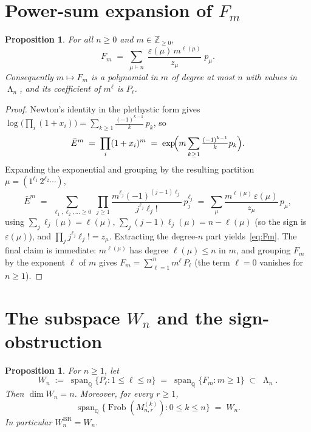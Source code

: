 \documentclass[11pt]{article}
\newtheorem{proposition}[theorem]{Proposition}
\theoremstyle{definition}
\DeclareMathOperator{\Frob}{Frob}
\DeclareMathOperator{\Lam}{\Lambda}
\DeclareMathOperator{\spann}{span}
\newcommand{\bE}{\bar{E}}
\newcommand{\eps}{\varepsilon}
\newcommand{\ZZ}{\mathbb{Z}}
\newcommand{\QQ}{\mathbb{Q}}
\begin{document}
\section{Power-sum expansion of $F_m$}

\begin{proposition}\label{prop:Fm}
For all $n\ge 0$ and $m\in\ZZ_{\ge 0}$,
\begin{equation}\label{eq:Fm}
   F_m \;=\; \sum_{\mu\vdash n}\;\frac{\eps(\mu)\,m^{\ell(\mu)}}{z_\mu}\;p_\mu.
\end{equation}
Consequently $m\mapsto F_m$ is a polynomial in $m$ of degree at most $n$
with values in $\Lam_n$, and its coefficient of $m^\ell$ is $P_\ell$.
\end{proposition}

\begin{proof}
Newton's identity in the plethystic form gives
$\log\bigl(\prod_i(1+x_i)\bigr)=\sum_{k\ge 1}\frac{(-1)^{k-1}}{k}\,p_k$,
so
\[
   \bE^m
   \;=\;\prod_i(1+x_i)^m
   \;=\;\exp\!\Bigl(m\sum_{k\ge 1}\tfrac{(-1)^{k-1}}{k}p_k\Bigr).
\]
Expanding the exponential and grouping by the resulting partition
$\mu=(1^{\ell_1}\,2^{\ell_2}\cdots)$,
\[
   \bE^m
   \;=\;\sum_{\ell_1,\ell_2,\ldots\ge 0}\;
        \prod_{j\ge 1}\frac{m^{\ell_j}(-1)^{(j-1)\ell_j}}{j^{\ell_j}\ell_j!}\,p_j^{\ell_j}
   \;=\;\sum_{\mu}\frac{m^{\ell(\mu)}\,\eps(\mu)}{z_\mu}\,p_\mu,
\]
using $\sum_j\ell_j(\mu)=\ell(\mu)$, $\sum_j(j-1)\ell_j(\mu)=n-\ell(\mu)$
(so the sign is $\eps(\mu)$), and $\prod_jj^{\ell_j}\ell_j!=z_\mu$.
Extracting the degree-$n$ part yields~\eqref{eq:Fm}. The final claim is
immediate: $m^{\ell(\mu)}$ has degree $\ell(\mu)\le n$ in $m$, and grouping
$F_m$ by the exponent $\ell$ of $m$ gives $F_m=\sum_{\ell=1}^{n}m^\ell\,P_\ell$
(the term $\ell=0$ vanishes for $n\ge 1$).
\end{proof}

\section{The subspace $W_n$ and the sign-obstruction}

\begin{proposition}\label{prop:Wn}
For $n\ge 1$, let
\[
   W_n \;:=\; \spann_{\QQ}\bigl\{P_\ell:1\le\ell\le n\bigr\}
   \;=\; \spann_{\QQ}\bigl\{F_m:m\ge 1\bigr\}
   \;\subset\;\Lam_n.
\]
Then $\dim W_n=n$. Moreover, for every $r\ge 1$,
\[
   \spann_{\QQ}\bigl\{\Frob(M_{n,r}^{(k)}):0\le k\le n\bigr\}
   \;=\; W_n.
\]
In particular $W_n^{\mathrm{BR}}=W_n$.
\end{proposition}
\end{document}
